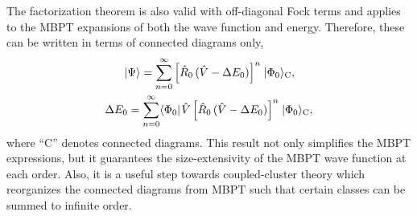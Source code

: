 \documentclass[thesis.tex]{subfiles}
\begin{document}
The factorization theorem is also valid with off-diagonal Fock terms and applies to the MBPT expansions of both the wave function and energy.  Therefore, these can be written in terms of connected diagrams only,
\begin{gather}
  \hspace{1pt}\lvert \Psi \rangle = \sum_{n=0}^{\infty}\left[\hat{R}_{0}\mathop{(\hat{V} - \Delta E_{0})}\right]^{n}\hspace{1pt}\lvert \Phi_{0} \rangle_{\text{C}}, \\
  \Delta E_{0} = \sum_{n=0}^{\infty}\langle \Phi_{0} |\hspace{1pt}\hat{V}\left[\hat{R}_{0}\mathop{(\hat{V} - \Delta E_{0})}\right]^{n}\hspace{1pt}\lvert \Phi_{0} \rangle_{\text{C}},
\end{gather}
where ``C'' denotes connected diagrams.  This result not only simplifies the MBPT expressions, but it guarantees the size-extensivity of the MBPT wave function at each order.  Also, it is a useful step towards coupled-cluster theory which reorganizes the connected diagrams from MBPT such that certain classes can be summed to infinite order.
\end{document}
